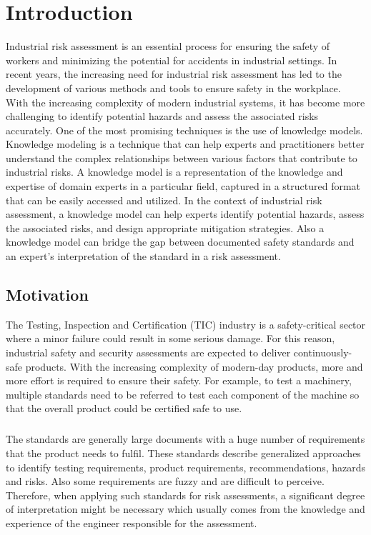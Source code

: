 \chapter{Introduction} \label{introduction}

\bigskip\bigskip 

Industrial risk assessment is an essential process for ensuring the safety of workers and minimizing the potential for accidents in industrial settings. In recent years, the increasing need for industrial risk assessment has led to the development of various methods and tools to ensure safety in the workplace. With the increasing complexity of modern industrial systems, it has become more challenging to identify potential hazards and assess the associated risks accurately. One of the most promising techniques is the use of knowledge models. Knowledge modeling is a technique that can help experts and practitioners better understand the complex relationships between various factors that contribute to industrial risks. A knowledge model is a representation of the knowledge and expertise of domain experts in a particular field, captured in a structured format that can be easily accessed and utilized. In the context of industrial risk assessment, a knowledge model can help experts identify potential hazards, assess the associated risks, and design appropriate mitigation strategies. Also a knowledge model can bridge the gap between documented safety standards and an expert's interpretation of the standard in a risk assessment.

\section{Motivation}\label{motivation}

The Testing, Inspection and Certification (TIC) industry is a safety-critical sector where a minor failure could result in some serious damage. For this reason, industrial safety and security assessments are expected to deliver continuously-safe products. With the increasing complexity of modern-day products, more and more effort is required to ensure their safety. For example, to test a machinery, multiple standards need to be referred to test each component of the machine so that the overall product could be certified safe to use. 

\paragraph{} The standards are generally large documents with a huge number of requirements that the product needs to fulfil. These standards describe generalized approaches to identify testing requirements, product requirements, recommendations, hazards and risks. Also some requirements are fuzzy and are difficult to perceive. Therefore, when applying such standards for risk assessments, a significant degree of interpretation might be necessary which usually comes from the knowledge and experience of the engineer responsible for the assessment. 

